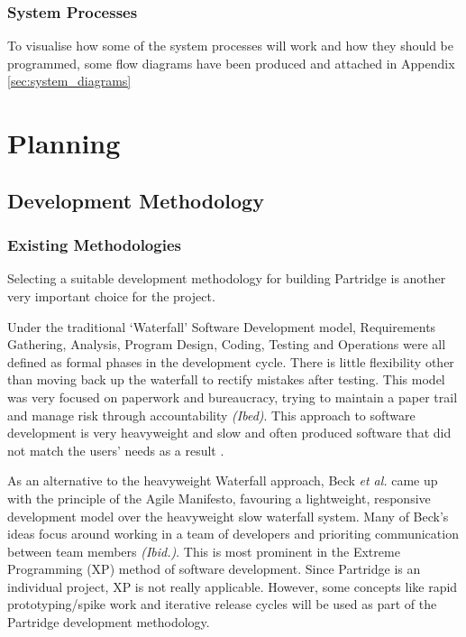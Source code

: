 \documentclass[12pt,a4paper]{article}
\begin{document}
\subsubsection{System Processes}

To visualise how some of the system processes will work and how they should be
programmed, some flow diagrams have been produced and attached in Appendix
\ref{sec:system_diagrams}

\section{Planning}

\subsection{Development Methodology}

\subsubsection{Existing Methodologies}
Selecting a suitable development methodology for building Partridge is another
very important choice for the project.

Under the traditional `Waterfall' Software Development model, Requirements
Gathering, Analysis, Program Design, Coding, Testing and Operations were all
defined as formal phases in the development cycle. There is little flexibility
other than moving back up the waterfall to rectify mistakes after
testing\cite{Royce:1987:MDL:41765.41801}. This model was very focused on
paperwork and bureaucracy, trying to maintain a paper trail and manage risk
through accountability \emph{(Ibed)}. This approach to software development is
very heavyweight and slow and often produced software that did not match the
users' needs as a result \cite{Boehm1988}.

As an alternative to the heavyweight Waterfall approach, Beck \emph{et al.} came up
with the principle of the Agile Manifesto, favouring a lightweight, responsive
development model over the heavyweight slow waterfall
system\cite{beck2001agile}. Many of Beck's ideas focus around working in a team
of developers and prioriting communication between team members \emph{(Ibid.)}.
This is most prominent in the Extreme Programming (XP) method of software
development. Since Partridge is an individual project, XP is not really
applicable. However, some concepts like rapid prototyping/spike work and
iterative release cycles will be used as part of the Partridge development
methodology.
\end{document}
